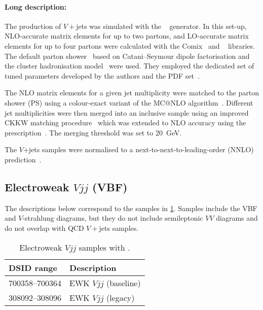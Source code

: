 \paragraph{Long description:}

The production of \(V+\)jets was simulated with the \SHERPA[2.2.1]~\cite{Bothmann:2019yzt}
generator. In this set-up, NLO-accurate matrix elements for up to two partons, and LO-accurate matrix elements for up
to four partons were calculated with the Comix~\cite{Gleisberg:2008fv} and
\OPENLOOPS~\cite{Buccioni:2019sur,Cascioli:2011va,Denner:2016kdg} libraries.
The default \SHERPA parton shower~\cite{Schumann:2007mg} based on
Catani--Seymour dipole factorisation and the cluster hadronisation model~\cite{Winter:2003tt}
were used. They employed the dedicated set of tuned parameters developed by the
\SHERPA authors and the \NNPDF[3.0nnlo] PDF set~\cite{Ball:2014uwa}.

The NLO matrix elements for a given jet multiplicity were matched to the parton
shower (PS) using a colour-exact variant of the MC@NLO
algorithm~\cite{Hoeche:2011fd}. Different jet multiplicities were then merged
into an inclusive sample using an improved CKKW matching
procedure~\cite{Catani:2001cc,Hoeche:2009rj} which was extended to NLO
accuracy using the \MEPSatNLO prescription~\cite{Hoeche:2012yf}. The merging threshold
was set to \qty{20}{\GeV}.



The \(V\)+jets samples were normalised to a next-to-next-to-leading-order (NNLO)
prediction~\cite{Anastasiou:2003ds}.


\subsection{Electroweak \(Vjj\) (VBF)}

The descriptions below correspond to the samples in
\cref{tab:ewkvjets-sherpa}.  Samples include the VBF and \(V\)-strahlung diagrams, but
they do not include semileptonic \(VV\) diagrams and do not overlap with QCD \(V+\)jets samples.

\begin{table}[!htbp]
  \caption{Electroweak \(Vjj\) samples with \SHERPA.}%
  \label{tab:ewkvjets-sherpa}
  \centering
  \begin{tabular}{l l}
    \toprule
    DSID range & Description \\
    \midrule
    700358--700364 & EWK \(Vjj\) (baseline) \\
    308092--308096 & EWK \(Vjj\) (legacy) \\
    \bottomrule
  \end{tabular}
\end{table}

